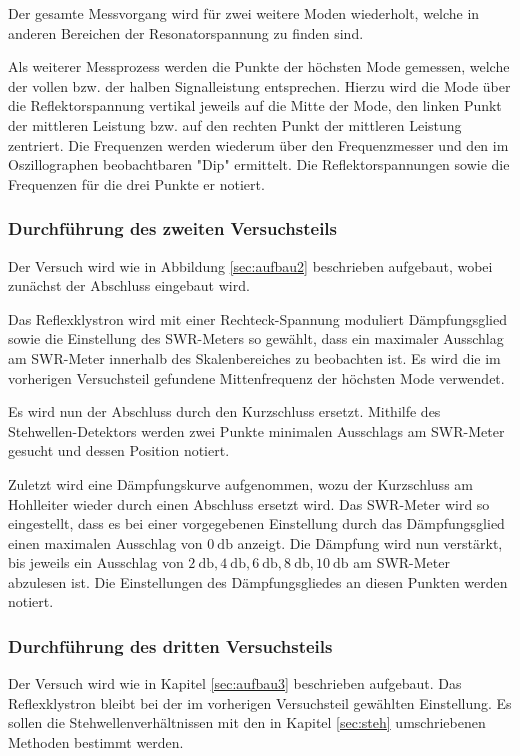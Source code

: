 Der gesamte Messvorgang wird für zwei weitere Moden wiederholt, welche in anderen Bereichen der Resonatorspannung zu finden sind.

Als weiterer Messprozess werden die Punkte der höchsten Mode gemessen, welche der vollen bzw. der halben Signalleistung entsprechen.
Hierzu wird die Mode über die Reflektorspannung vertikal jeweils auf die Mitte der Mode, den linken Punkt der mittleren Leistung bzw. auf den rechten Punkt der mittleren Leistung zentriert.
Die Frequenzen werden wiederum über den Frequenzmesser und den im Oszillographen beobachtbaren "Dip" ermittelt.
Die Reflektorspannungen sowie die Frequenzen für die drei Punkte er notiert.

\subsubsection{Durchführung des zweiten Versuchsteils}

Der Versuch wird wie in Abbildung \ref{sec:aufbau2} beschrieben aufgebaut, wobei zunächst der Abschluss eingebaut wird.

Das Reflexklystron wird mit einer Rechteck-Spannung moduliert Dämpfungsglied sowie die Einstellung des SWR-Meters so gewählt, dass ein maximaler Ausschlag am SWR-Meter innerhalb des Skalenbereiches zu beobachten ist.
Es wird die im vorherigen Versuchsteil gefundene Mittenfrequenz der höchsten Mode verwendet.

Es wird nun der Abschluss durch den Kurzschluss ersetzt.
Mithilfe des Stehwellen-Detektors werden zwei Punkte minimalen Ausschlags am SWR-Meter gesucht und dessen Position notiert.

Zuletzt wird eine Dämpfungskurve aufgenommen, wozu der Kurzschluss am Hohlleiter wieder durch einen Abschluss ersetzt wird.
Das SWR-Meter wird so eingestellt, dass es bei einer vorgegebenen Einstellung durch das Dämpfungsglied einen maximalen Ausschlag von $\SI{0}{\decibel}$ anzeigt.
Die Dämpfung wird nun verstärkt, bis jeweils ein Ausschlag von $\SI{2}{\decibel}, \SI{4}{\decibel}, \SI{6}{\decibel}, \SI{8}{\decibel}, \SI{10}{\decibel}$ am SWR-Meter abzulesen ist.
Die Einstellungen des Dämpfungsgliedes an diesen Punkten werden notiert.

\subsubsection{Durchführung des dritten Versuchsteils}

Der Versuch wird wie in Kapitel \ref{sec:aufbau3} beschrieben aufgebaut.
Das Reflexklystron bleibt bei der im vorherigen Versuchsteil gewählten Einstellung.
Es sollen die Stehwellenverhältnissen mit den in Kapitel \ref{sec:steh} umschriebenen Methoden bestimmt werden.

